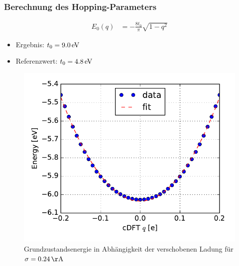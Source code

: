 \begin{frame}
\frametitle{Berechnung des Hopping-Parameters}
\begin{minipage}{0.49\textwidth}
\begin{align*}
E_0(q) &= -\frac{8t_0}{\pi} \sqrt{1-q^2}
\end{align*}
\begin{itemize}
\setlength{\itemsep}{.5cm}
\item Ergebnis: $t_0 = \unit[9.0]{eV}$
\item Referenzwert: $t_0 = \unit[4.8]{eV}$
\end{itemize}
\end{minipage}
\begin{minipage}{0.49\textwidth}
\begin{figure}
\centering
\includegraphics[width = \textwidth]{Images/Hydrogen/charging/energy_fit_normal_sigma}
\caption{Grundzustandsenergie in Abhängigkeit der verschobenen Ladung für $\sigma = \unit[0.24]{\AA}$}
\label{}
\end{figure}
\end{minipage}
\end{frame}


